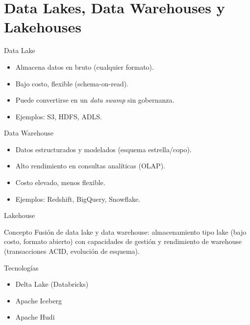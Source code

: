 \documentclass[aspectratio=169, 10pt, xcolor=table]{beamer}
\begin{document}
\section{Data Lakes, Data Warehouses y Lakehouses}

\begin{frame}{Data Lake}
    \begin{itemize}
        \item Almacena datos en bruto (cualquier formato).
        \item Bajo costo, flexible (schema-on-read).
        \item Puede convertirse en un \textit{data swamp} sin gobernanza.
        \item Ejemplos: S3, HDFS, ADLS.
    \end{itemize}
\end{frame}

\begin{frame}{Data Warehouse}
    \begin{itemize}
        \item Datos estructurados y modelados (esquema estrella/copo).
        \item Alto rendimiento en consultas analíticas (OLAP).
        \item Costo elevado, menos flexible.
        \item Ejemplos: Redshift, BigQuery, Snowflake.
    \end{itemize}
\end{frame}

\begin{frame}{Lakehouse}
    \begin{block}{Concepto}
        Fusión de data lake y data warehouse: almacenamiento tipo lake (bajo costo, formato abierto) con capacidades de gestión y rendimiento de warehouse (transacciones ACID, evolución de esquema).
    \end{block}
    \begin{exampleblock}{Tecnologías}
        \begin{itemize}
            \item Delta Lake (Databricks)
            \item Apache Iceberg
            \item Apache Hudi
        \end{itemize}
    \end{exampleblock}
\end{frame}
\end{document}
